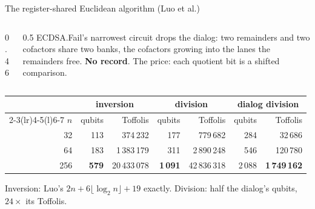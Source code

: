 \documentclass[aspectratio=169,11pt]{beamer}
\begin{document}
\begin{frame}{The register-shared Euclidean algorithm (Luo et al.)}
  \begin{columns}[c]
    \begin{column}{0.46\textwidth}
      \centering
    \end{column}
    \begin{column}{0.5\textwidth}
      \small ECDSA.Fail's narrowest circuit drops the dialog: two remainders and two cofactors share two banks, the cofactors growing into the lanes the remainders free. \textbf{No record}.
      \vskip2mm
      The price: each quotient bit is a shifted comparison.
    \end{column}
  \end{columns}
  \vskip1.5mm
  \centering\footnotesize
  \renewcommand{\arraystretch}{1.05}
  \begin{tabular}{@{}rrrrrrr@{}}
    \toprule
    & \multicolumn{2}{c}{inversion} & \multicolumn{2}{c}{division} & \multicolumn{2}{c}{dialog division} \\
    \cmidrule(lr){2-3}\cmidrule(lr){4-5}\cmidrule(l){6-7}
    $n$ & qubits & Toffolis & qubits & Toffolis & qubits & Toffolis \\
    \midrule
    32 & 113 & 374\,232 & 177 & 779\,682 & 284 & 32\,686 \\
    64 & 183 & 1\,383\,179 & 311 & 2\,890\,248 & 546 & 120\,780 \\
    256 & \textbf{579} & 20\,433\,078 & \textbf{1\,091} & 42\,836\,318 & 2\,088 & \textbf{1\,749\,162} \\
    \bottomrule
  \end{tabular}\par
  \vskip1mm
  {\small Inversion: Luo's $2n+6\lfloor\log_2n\rfloor+19$ exactly. Division: half the dialog's qubits, $24\times$ its Toffolis.}
\end{frame}
\end{document}
